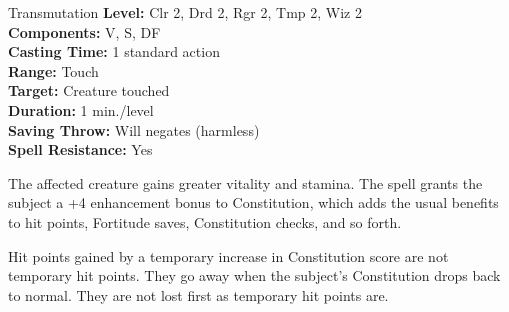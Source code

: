 {Transmutation}
{
	\textbf{Level:}
	Clr 2, Drd 2, Rgr 2, Tmp 2, Wiz 2\\
	\textbf{Components:}
	V, S, DF\\
	\textbf{Casting Time:}
	1 standard action\\
	\textbf{Range:}
	Touch\\
	\textbf{Target:}
	Creature touched\\
	\textbf{Duration:}
	1 min./level\\
	\textbf{Saving Throw:}
	Will negates (harmless)\\
	\textbf{Spell Resistance:}
	Yes\\
}
{
	The affected creature gains greater vitality and stamina. The spell grants the subject a +4 enhancement bonus to Constitution, which adds the usual benefits to hit points, Fortitude saves, Constitution checks, and so forth.

	Hit points gained by a temporary increase in Constitution score are not temporary hit points. They go away when the subject's Constitution drops back to normal. They are not lost first as temporary hit points are.

}
